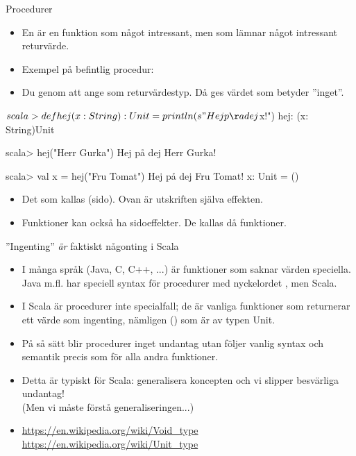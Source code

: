 \begin{Slide}{Procedurer}\SlideFontSmall
\begin{itemize}
\item En  är en funktion som  något intressant, men som  lämnar något intressant returvärde.
\item Exempel på befintlig procedur: 
\item Du  genom att ange \texttt{} som returvärdestyp. Då ges värdet \texttt{\Alert{()}} som betyder ''inget''.
\end{itemize}
\begin{REPL}$%
scala> def hej(x: String): Unit = println(s"Hej på dej $x!")
hej: (x: String)Unit

scala> hej("Herr Gurka")
Hej på dej Herr Gurka!

scala> val x = hej("Fru Tomat")
Hej på dej Fru Tomat!
x: Unit = ()
\end{REPL}
\begin{itemize}
\item Det som  kallas (sido). Ovan är utskriften själva effekten.
\item Funktioner kan också ha sidoeffekter. De kallas då  funktioner.
\end{itemize}
\end{Slide}

\begin{Slide}{''Ingenting'' \emph{är} faktiskt någonting i Scala}
\begin{itemize}
\item I många språk (Java, C, C++, ...) är funktioner som saknar värden speciella.
 Java m.fl. har speciell syntax för procedurer med nyckelordet , men  Scala.

\item I Scala är procedurer inte specialfall; de är vanliga funktioner som returnerar ett värde som  ingenting, nämligen () som är av typen Unit.

\item På så sätt blir procedurer inget undantag utan följer vanlig syntax och semantik precis som för alla andra funktioner.

\item Detta är typiskt för Scala: generalisera koncepten och vi slipper besvärliga undantag! \\(Men vi måste förstå generaliseringen...)


\item [] {\SlideFontSmall
\url{https://en.wikipedia.org/wiki/Void_type}
\url{https://en.wikipedia.org/wiki/Unit_type}
}

\end{itemize}

\end{Slide}

